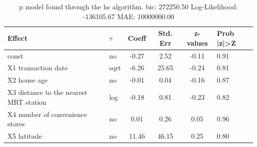 \begin{table}
	\caption{p model found through the hs algorithm. bic: 272250.50 Log-Likelihood: -136105.67 MAE: 10000000.00}
	\begin{center}
		\begin{tabular}{|l|l|c|c|c|l|}
			\hline
			Effect & $\tau$ & Coeff & Std. Err & z-values & Prob |z|>Z \\
			\hline
			const & no & -0.27 & 2.52 & -0.11 & 0.91 \\
			\hline
			X1 transaction date & sqrt & -6.26 & 25.65 & -0.24 & 0.81 \\
			\hline
			X2 house age & no & -0.01 & 0.04 & -0.16 & 0.87 \\
			\hline
			X3 distance to the nearest MRT station & log & -0.18 & 0.81 & -0.23 & 0.82 \\
			\hline
			X4 number of convenience stores & no & 0.01 & 0.26 & 0.05 & 0.96 \\
			\hline
			X5 latitude & no & 11.46 & 46.15 & 0.25 & 0.80 \\
			\hline
		\end{tabular}
	\end{center}
\end{table}